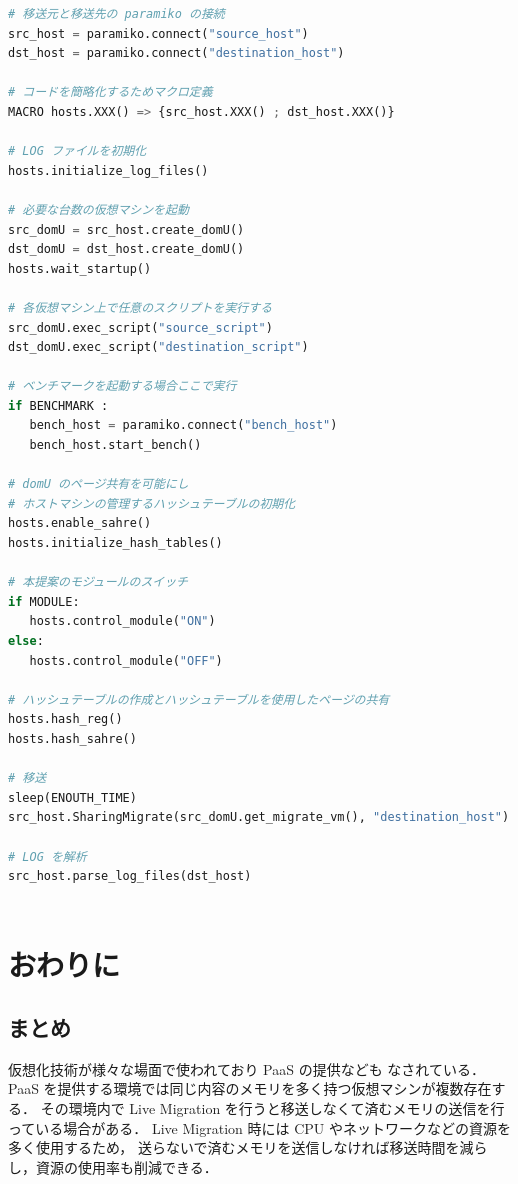 \documentclass[graduation-thesis]{mlarticle}
\begin{document}
\clearpage
\begin{lstlisting}[language=Python, caption=実験の疑似コード, label=exp_code]
# 移送元と移送先の paramiko の接続
src_host = paramiko.connect("source_host")
dst_host = paramiko.connect("destination_host")

# コードを簡略化するためマクロ定義
MACRO hosts.XXX() => {src_host.XXX() ; dst_host.XXX()}

# LOG ファイルを初期化
hosts.initialize_log_files()

# 必要な台数の仮想マシンを起動
src_domU = src_host.create_domU()
dst_domU = dst_host.create_domU()
hosts.wait_startup()

# 各仮想マシン上で任意のスクリプトを実行する
src_domU.exec_script("source_script")
dst_domU.exec_script("destination_script")

# ベンチマークを起動する場合ここで実行
if BENCHMARK :
   bench_host = paramiko.connect("bench_host")
   bench_host.start_bench()
   
# domU のページ共有を可能にし
# ホストマシンの管理するハッシュテーブルの初期化
hosts.enable_sahre()
hosts.initialize_hash_tables()

# 本提案のモジュールのスイッチ
if MODULE:
   hosts.control_module("ON")
else:
   hosts.control_module("OFF")

# ハッシュテーブルの作成とハッシュテーブルを使用したページの共有
hosts.hash_reg()
hosts.hash_sahre()

# 移送
sleep(ENOUTH_TIME)
src_host.SharingMigrate(src_domU.get_migrate_vm(), "destination_host")

# LOG を解析
src_host.parse_log_files(dst_host)
                         
\end{lstlisting}

\clearpage
\section{おわりに}
\label{sec-7}
\subsection{まとめ}
\label{sec-7-1}
仮想化技術が様々な場面で使われており PaaS の提供なども
なされている．PaaS を提供する環境では同じ内容のメモリを多く持つ仮想マシンが複数存在する．
その環境内で Live Migration を行うと移送しなくて済むメモリの送信を行っている場合がある．
Live Migration 時には CPU やネットワークなどの資源を多く使用するため，
送らないで済むメモリを送信しなければ移送時間を減らし，資源の使用率も削減できる．
\end{document}
